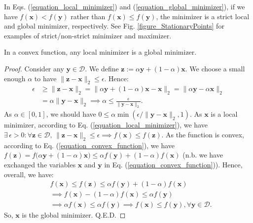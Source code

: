 \documentclass[lang=cn,10pt]{gorgeousnbook}
\numberwithin{equation}{section}%
\numberwithin{figure}{section}%
\begin{document}
\begin{definition}
In Eqs. (\ref{equation_local_minimizer}) and (\ref{equation_global_minimizer}), if we have $f(\boldsymbol{x}) < f(\boldsymbol{y})$ rather than $f(\boldsymbol{x}) \leq f(\boldsymbol{y})$, the minimizer is a strict local and global minimizer, respectively. 
See Fig. \ref{figure_StationaryPoints} for examples of strict/non-strict minimizer and maximizer.
\end{definition}

\begin{lemma}\label{lemma_global_min_convex_function}
In a convex function, any local minimizer is a global minimizer. 
\end{lemma}
\begin{proof}
Consider any $\boldsymbol{y} \in \mathcal{D}$. We define $\boldsymbol{z} := \alpha \boldsymbol{y} + (1 - \alpha) \boldsymbol{x}$. We choose a small enough $\alpha$ to have $\|\boldsymbol{z} - \boldsymbol{x}\|_2 \leq \epsilon$. Hence:
\begin{align*}
\epsilon &\geq \|\boldsymbol{z} - \boldsymbol{x}\|_2 = \|\alpha \boldsymbol{y} + (1 - \alpha) \boldsymbol{x}-\boldsymbol{x}\|_2 = \|\alpha \boldsymbol{y} - \alpha \boldsymbol{x}\|_2 \\
&= \alpha \|\boldsymbol{y} - \boldsymbol{x}\|_2 \implies \alpha \leq \frac{\epsilon}{\|\boldsymbol{y} - \boldsymbol{x}\|_2}.
\end{align*}
As $\alpha \in [0,1]$, we should have $0 \leq \alpha \min(\epsilon / \|\boldsymbol{y} - \boldsymbol{x}\|_2, 1)$.
As $\boldsymbol{x}$ is a local minimizer, according to Eq. (\ref{equation_local_minimizer}), we have $\exists\, \epsilon > 0 : \forall \boldsymbol{z} \in \mathcal{D},\, \|\boldsymbol{z} - \boldsymbol{x}\|_2 \leq \epsilon \implies f(\boldsymbol{x}) \leq f(\boldsymbol{z})$.
As the function is convex, according to Eq. (\ref{equation_convex_function}), we have $f(\boldsymbol{z}) = f\big(\alpha \boldsymbol{y} + (1-\alpha) \boldsymbol{x}\big) \leq \alpha f(\boldsymbol{y}) + (1-\alpha) f(\boldsymbol{x})$ (n.b. we have exchanged the variables $\boldsymbol{x}$ and $\boldsymbol{y}$ in Eq. (\ref{equation_convex_function})).
Hence, overall, we have:
\begin{align*}
&f(\boldsymbol{x}) \leq f(\boldsymbol{z}) \leq \alpha f(\boldsymbol{y}) + (1-\alpha) f(\boldsymbol{x}) \\
&\implies f(\boldsymbol{x}) - (1-\alpha) f(\boldsymbol{x}) \leq \alpha f(\boldsymbol{y}) \\
&\implies \alpha f(\boldsymbol{x}) \leq \alpha f(\boldsymbol{y}) \implies f(\boldsymbol{x}) \leq f(\boldsymbol{y}), \forall \boldsymbol{y} \in \mathcal{D}.
\end{align*}
So, $\boldsymbol{x}$ is the global minimizer. Q.E.D.
\end{proof}
\end{document}
